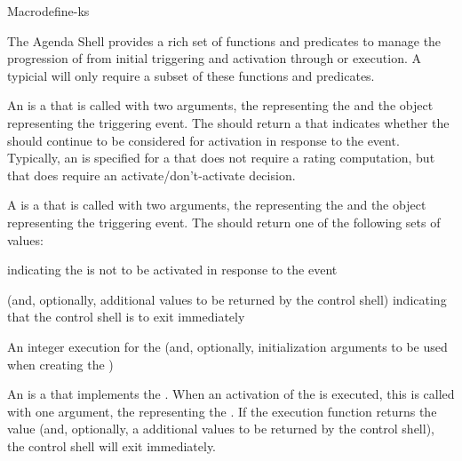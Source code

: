\documentclass[10pt,twoside,english,pdftex]{article}
\begin{document}
\begin{functiondoc}{Macro}{define-ks}

%
%
%
%
%
%
%
The Agenda Shell provides a rich set of  functions and predicates to
manage the progression of  from initial triggering and activation
through  or execution.  A typicial  will only
require a subset of these functions and predicates.

An  is a  that is called with two
arguments, the  representing the  and the
object representing the triggering event.  The 
should return a  that indicates whether the
 should continue to be considered for activation in response to the
event.  Typically, an  is specified for a
 that does not require a  rating
computation, but that does require an activate/don't-activate decision.

A  is a  that is called with two
arguments, the  representing the  and the
object representing the triggering event.  The 
should return one of the following sets of values:
\begin{tightitemize}
\item \nil{} indicating the  is not to be activated in response to
  the event
\item {} (and, optionally, additional values to be returned by the
  control shell) indicating that the control shell is to exit immediately
\item An integer execution  for the  (and,
  optionally, initialization arguments to be used when creating the
   )
\end{tightitemize}

An  is a  that implements the
.  When an activation of the  is executed, this
 is called with one argument, the 
representing the . If the execution function returns the value
 (and, optionally, a additional values to be returned by the
control shell), the control shell will exit immediately.


\end{functiondoc}
\end{document}
